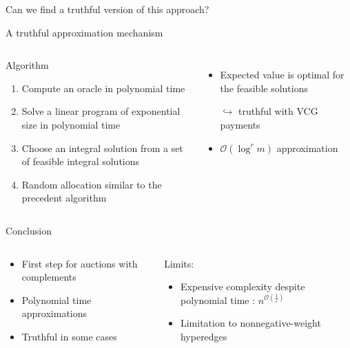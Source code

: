\documentclass[aspectratio=169]{beamer}
\begin{document}
\begin{frame}[standout]
    Can we find a \alert{truthful version} of this approach?
\end{frame}

\begin{frame}{A truthful approximation mechanism}
    \begin{columns}
        \begin{block}{Algorithm}
            \begin{enumerate}
                \item Compute an oracle in polynomial time
                \item Solve a linear program of exponential size in polynomial time
                \item Choose an integral solution from a set of feasible integral solutions
                \item Random allocation similar to the precedent algorithm
            \end{enumerate}
        \end{block}

        \begin{itemize}
            \item Expected value is optimal for the feasible solutions

                  \(\hookrightarrow\) \alert{truthful} with VCG payments
            \item \(\mathcal{O}(\log^r m)\) approximation
        \end{itemize}

    \end{columns}
\end{frame}

\begin{frame}{Conclusion}
    \begin{columns}
        \begin{column}{0.5\textwidth}
            \begin{itemize}
                \item First step for auctions with complements
                \item Polynomial time approximations
                \item Truthful in some cases
            \end{itemize}
        \end{column}
        \begin{column}{0.5\textwidth}
            Limits:
            \begin{itemize}
                \item Expensive complexity despite polynomial time : \(n^{\mathcal{O}\left(\frac{1}{\varepsilon}\right)}\)
                \item Limitation to nonnegative-weight hyperedges
            \end{itemize}
        \end{column}
    \end{columns}
\end{frame}
\end{document}
